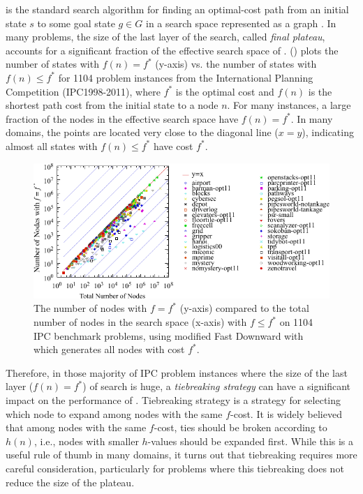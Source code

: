\astar is the standard search
algorithm for finding an optimal-cost path from an initial state $s$ to
some goal state $g \in G$ in a search space represented as a graph
\cite{hart1968formal}.
In many problems, the size of the last layer of the search, called
\emph{final plateau}, accounts for a significant fraction of the
effective search space of \astar.  
() plots the number of states with $f(n) = f^*$
(y-axis) vs. the number of states with $f(n) \leq f^*$ for 1104 problem
instances from the International Planning Competition (IPC1998-2011),
where $f^*$ is the optimal cost and $f(n)$ is the shortest path cost
from the initial state to a node $n$.  For many instances, a large
fraction of the nodes in the effective search space have $f(n)=f^*$.
In many domains, the points are located very close to the diagonal line
($x=y$), indicating almost all states with $f(n) \leq f^*$ have cost
$f^*$.

\begin{figure}[htbp]
  \centering
  \includegraphics{tables/aaai16-frontier/aaai16prelim3/lmcut_frontier_noh-front.pdf}
 \caption{
 The number of nodes with $f=f^*$ (y-axis) compared to the
 total number of nodes in the search space (x-axis) with $f\leq f^*$ on 1104 IPC benchmark problems,
  using modified Fast Downward with \lmcut which 
  generates all nodes with cost $f^*$.
  }
 \label{fig:plateau-noh}
\end{figure}

Therefore, in those majority of IPC problem instances where the size of
the last layer ($f(n)=f^*$) of search is huge, a
\emph{tiebreaking strategy} can have a significant impact on the
performance of \astar. Tiebreaking strategy is a strategy 
for selecting which node to expand among nodes with the same $f$-cost.
It is widely believed that among nodes with the same $f$-cost,
ties should be broken according to $h(n)$, i.e.,
nodes with smaller $h$-values should be expanded first.  While this is a
useful rule of thumb in many domains, it turns out that tiebreaking
requires more careful consideration, particularly for problems where
this tiebreaking does not reduce the size of the plateau.

